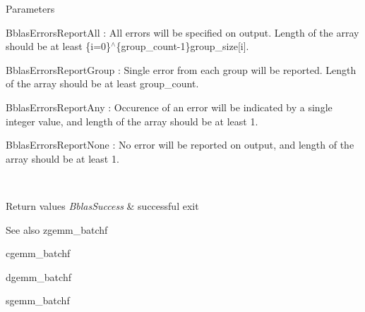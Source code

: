 \begin{DoxyParams}[1]{Parameters}
\begin{DoxyItemize}
\item Bblas\+Errors\+Report\+All \+: All errors will be specified on output. Length of the array should be at least \{i=0\}$^\wedge$\{group\+\_\+count-\/1\}group\+\_\+size\mbox{[}i\mbox{]}.
\item Bblas\+Errors\+Report\+Group \+: Single error from each group will be reported. Length of the array should be at least group\+\_\+count.
\item Bblas\+Errors\+Report\+Any \+: Occurence of an error will be indicated by a single integer value, and length of the array should be at least 1.
\item Bblas\+Errors\+Report\+None \+: No error will be reported on output, and length of the array should be at least 1.
\end{DoxyItemize}\\
\hline
\end{DoxyParams}

\begin{DoxyRetVals}{Return values}
{\em Bblas\+Success} & successful exit\\
\hline
\end{DoxyRetVals}
\begin{DoxySeeAlso}{See also}
zgemm\+\_\+batchf 

cgemm\+\_\+batchf 

dgemm\+\_\+batchf 

sgemm\+\_\+batchf 
\end{DoxySeeAlso}
